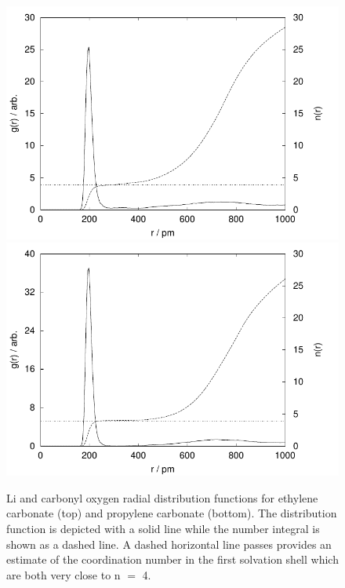 \begin{ecpc}
\begin{figure}
 \begin{center}
 \includegraphics[width=0.8\linewidth]{images/ecpc/liec_32-noWC-rdf.pdf} \\
 \includegraphics[width=0.8\linewidth]{images/ecpc/lipc_32-noWC-rdf.pdf}
 \end{center}
 \caption[Li$^{+}$ and carbonyl oxygen radial distribution functions]{\label{fig:rdf}Li\sur{+} and carbonyl oxygen radial distribution 
 functions for ethylene carbonate (top) and
 propylene carbonate (bottom). The distribution function is depicted with a solid line while the number integral is 
 shown as a dashed line. A dashed horizontal line passes provides an estimate of the coordination number in the first
 solvation shell which are both very close to n $=$ 4.}
\end{figure}


\end{ecpc}
